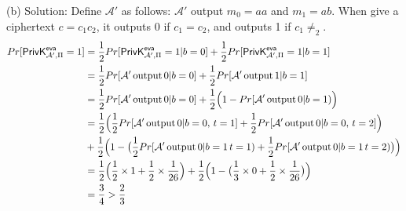 \documentclass[a4papers]{ctexart}
\begin{document}
\noindent (b) Solution:
Define $\mathcal{A'}$ as follows: $\mathcal{A'}$ output $m_0=aa$ and $m_1=ab$.
When give a ciphertext $c=c_1 c_2$, it outputs 0 if $c_1=c_2$, and outputs 1 if $c_1\ne _2$.
\begin{alignat*}{2}
    Pr[\mathsf{PrivK}^{\mathsf{eva}}_{\mathcal{A'},\Pi}=1] 
    &= \dfrac{1}{2}Pr[\mathsf{PrivK}^{\mathsf{eva}}_{\mathcal{A'},\Pi}=1 | b=0] + \dfrac{1}{2}Pr[\mathsf{PrivK}^{\mathsf{eva}}_{\mathcal{A'},\Pi}=1 | b=1]\\
    &= \dfrac{1}{2}Pr[\mathcal{A'}\, {\rm output}\, 0 | b=0 ] + \dfrac{1}{2}Pr[\mathcal{A'} \,{\rm output}\, 1 | b=1 ]\\
    &= \dfrac{1}{2}Pr[\mathcal{A'}\, {\rm output}\, 0 | b=0 ] +  \dfrac{1}{2}\Big(1-Pr[\mathcal{A'}\, {\rm output} \, 0|b=1) \Big)\\
    &= \dfrac{1}{2}\Big( \dfrac{1}{2}Pr[\mathcal{A'}\, {\rm output}\, 0 | b=0,\, t=1 ]+\dfrac{1}{2}Pr[\mathcal{A'}\, {\rm output}\, 0 | b=0,\, t=2 ]\Big)\\
    &+ \dfrac{1}{2}\Big( 1 - \big( \dfrac{1}{2} Pr[\mathcal{A'}\, {\rm output} \, 0|b=1\, t=1) +  \dfrac{1}{2} Pr[\mathcal{A'}\, {\rm output} \, 0|b=1\, t=2)\big)\Big)\\
    &= \dfrac{1}{2}\Big(\dfrac{1}{2}\times 1+\dfrac{1}{2}\times\dfrac{1}{26} \Big)
      + \dfrac{1}{2}\Big(1-\big(\dfrac{1}{3}\times 0+\dfrac{1}{2}\times\dfrac{1}{26} \big)\Big)\\
    &= \dfrac{3}{4} > \dfrac{2}{3}
\end{alignat*}
\end{document}
